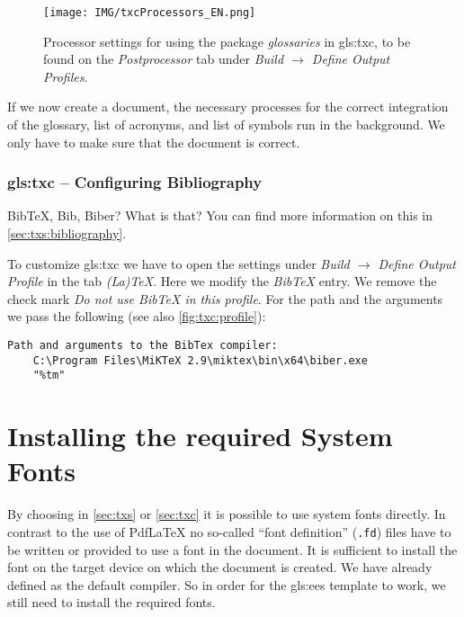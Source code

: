\begin{figure}[htb]
	\texttt{[image: IMG/txcProcessors\_EN.png]}
	\caption[Settings for \gls{gls:txc} -- Processors for the package \textit{glossaries}]{Processor settings for using the package \textit{glossaries} in \gls{gls:txc}, to be found on the \textit{Postprocessor} tab under \textit{Build $\rightarrow$ Define Output Profiles}.}
	\label{fig:txc:processors}
\end{figure}

If we now create a document, the necessary processes for the correct integration of the glossary, list of acronyms, and list of symbols run in the background. We only have to make sure that the \Latex document is correct.




\subsubsection{\gls*{gls:txc} -- Configuring Bibliography}
\label{sec:txc:bibliography}
Bib\TeX, Bib\Latex, Biber? What is that? You can find more information on this in \autoref{sec:txs:bibliography}.

To customize \gls{gls:txc} we have to open the settings under \textit{Build $\rightarrow$ Define Output Profile} in the tab \textit{(La)TeX}. Here we modify the \textit{BibTeX} entry. We remove the check mark \textit{Do not use BibTeX in this profile}. For the path and the arguments we pass the following (see also \autoref{fig:txc:profile}):

\begin{lstlisting}[language=none, caption=Configuration of the \textit{biber} compiler as replacement for Bib\TeX]
	Path and arguments to the BibTex compiler:
	C:\Program Files\MiKTeX 2.9\miktex\bin\x64\biber.exe
	"%tm"
\end{lstlisting}




\section{Installing the required System Fonts}
\label{sec:font}
By choosing {\LuaLaTeX} in \autoref{sec:txs} or \autoref{sec:txc} it is possible to use system fonts directly. In contrast to the use of {Pdf\LaTeX} no so-called \enquote{font definition} (\texttt{.fd}) files have to be written or provided to use a font in the document. It is sufficient to install the font on the target device on which the document is created. We have already defined {\LuaLaTeX} as the default compiler. So in order for the \gls{gls:ees} template to work, we still need to install the required fonts.

